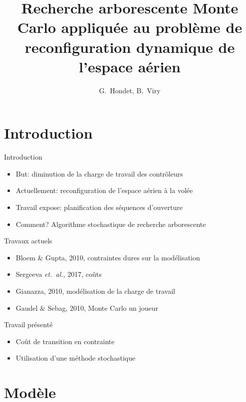 \documentclass[tikz]{beamer}
\title[Reconfiguration par Monte Carlo]{%
  Recherche arborescente Monte Carlo appliquée au problème de reconfiguration
  dynamique de l'espace aérien
}
\author[Hondet, Viry]{G.~Hondet, B.~Viry}
\begin{document}
\begin{frame}
  \titlepage{}
\end{frame}


\section*{Introduction}

\begin{frame}[c]{Introduction}
  \begin{itemize}
    \item But: diminution de la charge de travail des contrôleurs
    \item Actuellement: reconfiguration de l'espace aérien à la volée
    \item Travail expose: planification des séquences d'ouverture
    \item Comment? Algorithme stochastique de recherche arborescente
  \end{itemize}
\end{frame}
\begin{frame}[c]{Travaux actuels}
  \begin{itemize}
    \item Bloem \& Gupta, 2010, contraintes dures sur la modélisation
    \item Sergeeva \textit{et.\ al.}, 2017, coûts
    \item Gianazza, 2010, modélisation de la charge de travail
    \item Gaudel \& Sebag, 2010, Monte Carlo un joueur
  \end{itemize}
  \begin{block}{Travail présenté}
    \begin{itemize}
      \item Coût de transition en contrainte
      \item Utilisation d'une méthode stochastique
    \end{itemize}
  \end{block}
\end{frame}

\section{Modèle}
\end{document}
